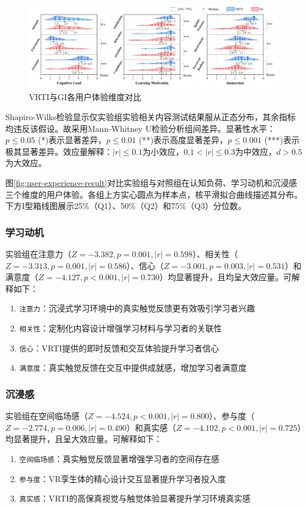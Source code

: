 \documentclass[runningheads]{llncs}
\begin{document}
\begin{figure}[t]
  \centering
  \includegraphics[width=\textwidth]{image/three-user-experience-result.pdf}
  \caption{VRTI与GI各用户体验维度对比}
  \label{fig:three-user-experience-result}
\end{figure}

Shapiro-Wilks检验显示仅实验组实验相关内容测试结果服从正态分布，其余指标均违反该假设。故采用Mann-Whitney U检验分析组间差异。显著性水平：$p \le 0.05$ (*)表示显著差异，$p \le 0.01$ (**)表示高度显著差异，$p \le 0.001$ (***)表示极其显著差异。效应量解释：$|r| \le 0.1$为小效应，$0.1 < |r| \le  0.3$为中效应，$d > 0.5$为大效应。

图\ref{fig:user-experience-result}对比实验组与对照组在认知负荷、学习动机和沉浸感三个维度的用户体验。各组上方实心圆点为样本点，核平滑拟合曲线描述其分布。下方I型箱线图展示25\%（Q1）、50\%（Q2）和75\%（Q3）分位数。

\subsubsection{学习动机}
实验组在注意力（$Z=-3.382, p=0.001, |r|=0.598$）、相关性（$Z=-3.313, p=0.001, |r|=0.586$）、信心（$Z=-3.001, p=0.003, |r|=0.531$）和满意度（$Z=-4.127, p<0.001, |r|=0.730$）均显著提升，且均呈大效应量。可解释如下：
\begin{enumerate}
  \item {\texttt{注意力}}：沉浸式学习环境中的真实触觉反馈更有效吸引学习者兴趣
  \item {\texttt{相关性}}：定制化内容设计增强学习材料与学习者的关联性
  \item {\texttt{信心}}：VRTI提供的即时反馈和交互体验提升学习者信心
  \item {\texttt{满意度}}：真实触觉反馈在交互中提供成就感，增加学习者满意度
\end{enumerate}

\subsubsection{沉浸感}
实验组在空间临场感（$Z=-4.524, p<0.001, |r|=0.800$）、参与度（$Z=-2.774, p=0.006, |r|=0.490$）和真实感（$Z=-4.102, p<0.001, |r|=0.725$）均显著提升，且呈大效应量。可解释如下：
\begin{enumerate}
  \item {\texttt{空间临场感}}：真实触觉反馈显著增强学习者的空间存在感
  \item {\texttt{参与度}}：VR孪生体的精心设计交互显著提升学习者投入度
  \item {\texttt{真实感}}：VRTI的高保真视觉与触觉体验显著提升学习环境真实感
\end{enumerate}
\end{document}
